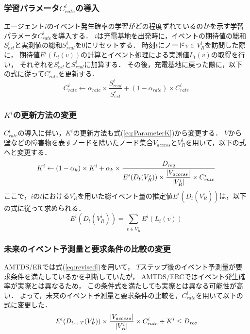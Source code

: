 \documentclass[12pt,a4j,twoside]{jarticle}
\def\Dreq{{D_{\it req}}}
\begin{document}
  \subsubsection{学習パラメータ$C^i_{rate}$の導入}
  エージェント$i$のイベント発生確率の学習がどの程度ずれているのかを示す学習パラメータ$C^i_{rate}$を導入する．
  $i$は充電基地を出発時に，イベントの期待値の総和$S^i_{est}$と実測値の総和$S^i_{real}$を0にリセットする．
  時刻$t$にノード$v \in V^i_R$を訪問した際に，
  期待値$E^i(L_t(v))$の計算とイベント処理による実測値$L_t(v)$の取得を行い，
  それぞれを$S^i_{est}$と$S^i_{real}$に加算する．
  その後，充電基地に戻った際に，以下の式に従って$C^i_{rate}$を更新する．
    \begin{equation}
      C^i_{rate} \gets \alpha_{rate} \times \dfrac{S^i_{real}}{S^i_{est}} + (1-\alpha_{rate}) \times C^i_{rate}
    \end{equation}
  
  \subsubsection{$K^i$の更新方法の変更}
  $C^i_{rate}$の導入に伴い，$K^i$の更新方法も式(\ref{eq:ParameterK})から変更する．
  $V$から壁などの障害物を表すノードを除いたノード集合$V_{access}$と$V^i_R$を用いて，以下の式へと変更する．
  \begin{equation}\label{eq:ParameterK/ERC}
    K^i \gets (1 - \alpha_k) \times K^i + \alpha_k \times \dfrac{\Dreq}{E^i(D_t(V^i_R)) \times \dfrac{|V_{access}|}{|V^i_R|} \times C^i_{rate}}
  \end{equation}
  ここで，$i$の$t$における$V^i_R$を用いた総イベント量の推定値$E^i(D_t(V^i_R))$は，以下の式に従って求められる．
    \begin{equation}
      E^i(D_t(V^i_R))=\sum_{v\in V^i_R} E^i(L_t(v))   
    \end{equation}

  \subsubsection{未来のイベント予測量と要求条件の比較の変更}
  AMTDS/ERでは式(\ref{eq:revised})を用いて，
  $T$ステップ後のイベント予測量が要求条件を満たしているかを判断していたが，
  AMTDS/ERCではイベント発生確率が実際とは異なるため，
  この条件式を満たしても実際とは異なる可能性が高い．
  よって，未来のイベント予測量と要求条件の比較を，$C^i_{rate}$を用いて以下の式に変更した．
  \begin{equation}\label{eq:revisedERC}
    E^i(D_{t_c+T}(V^i_R)) \times \dfrac{|V_{access}|}{|V^i_R|} \times C^i_{rate} \div K^i \leq \Dreq
  \end{equation} 
  
\end{document}
